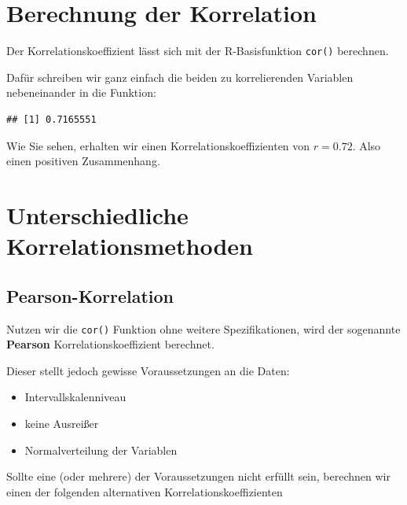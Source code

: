 \documentclass[
]{book}
\newenvironment{Shaded}{\begin{snugshade}}{\end{snugshade}}
\newcommand{\FunctionTok}[1]{\textcolor[rgb]{0.13,0.29,0.53}{\textbf{#1}}}
\newcommand{\NormalTok}[1]{#1}
\newcommand{\SpecialCharTok}[1]{\textcolor[rgb]{0.81,0.36,0.00}{\textbf{#1}}}
\providecommand{\tightlist}{%
  \setlength{\itemsep}{0pt}\setlength{\parskip}{0pt}}
\begin{document}
\section{Berechnung der Korrelation}\label{berechnung-der-korrelation}

Der Korrelationskoeffizient lässt sich mit der R-Basisfunktion \texttt{cor()} berechnen.

Dafür schreiben wir ganz einfach die beiden zu korrelierenden Variablen nebeneinander in die Funktion:

\begin{Shaded}
\end{Shaded}

\begin{verbatim}
## [1] 0.7165551
\end{verbatim}

Wie Sie sehen, erhalten wir einen Korrelationskoeffizienten von \(r=0.72\). Also einen positiven Zusammenhang.

\section{Unterschiedliche Korrelationsmethoden}\label{unterschiedliche-korrelationsmethoden}

\subsection{Pearson-Korrelation}\label{pearson-korrelation}

Nutzen wir die \texttt{cor()} Funktion ohne weitere Spezifikationen, wird der sogenannte \textbf{Pearson} Korrelationskoeffizient berechnet.

Dieser stellt jedoch gewisse Voraussetzungen an die Daten:

\begin{itemize}
\tightlist
\item
  Intervallskalenniveau
\item
  keine Ausreißer
\item
  Normalverteilung der Variablen
\end{itemize}

Sollte eine (oder mehrere) der Voraussetzungen nicht erfüllt sein, berechnen wir einen der folgenden alternativen Korrelationskoeffizienten
\end{document}
